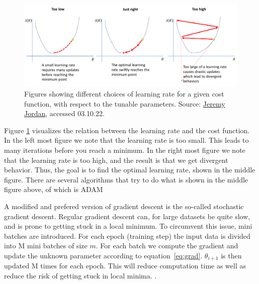 \begin{figure}[H]
    \includegraphics[width=\linewidth]{Figures/Machinelearning/lr_choice.png}
    \caption[Explaining concequence of choice of learning rate]{Figures showing different choices of learning rate for a given cost function, with respect to the tunable parameters. 
    Source: \href{https://www.jeremyjordan.me/content/images/2018/02/Screen-Shot-2018-02-24-at-11.47.09-AM.png}{Jeremy Jordan}, accessed 03.10.22.}
    \label{fig:lr_choice}
\end{figure}

Figure \ref{fig:lr_choice} visualizes the relation between the learning rate and the cost function. 
In the left most figure we note that the learning rate is too small. This leads to many iterations 
before you reach a minimum. In the right most figure we note that the learning rate is too high, 
and the result is that we get divergent behavior. Thus, the goal is to find the optimal learning 
rate, shown in the middle figure. There are several algorithms that try to do what is shown in 
the middle figure above, of which is ADAM\cite{ADAM:opti}\par 
A modified and prefered version of gradient descent is the so-called stochastic gradient descent.
Regular gradient descent can, for large datasets be quite slow, and is prone to getting stuck 
in a local minimum. To circumvent this issue, mini batches are introduced. For each epoch (training step) 
the input data is divided into M mini batches of size $m$. For each batch we compute the gradient and update the 
unknown parameter according to equation \ref{eq:grad}. $\theta_{i+1}$ is then updated M times for each epoch. 
This will reduce computation time as well as reduce the risk of getting stuck in local minima. \cite{FYSSTK}.




